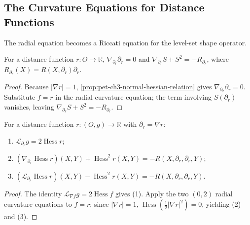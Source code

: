 \subsection{The Curvature Equations for Distance Functions}

The radial equation becomes a Riccati equation for the level-set shape
operator.

\begin{corollary}
  \label{cor:pet-ch3-radial-equation-distance-function}
  \leanok
  For a distance function $r:O\to\mathbb R$, $\nabla_{\partial_r}\partial_r=0$ and
  $\nabla_{\partial_r}S+S^2=-R_{\partial_r}$, where $R_{\partial_r}(X)=R(X,\partial_r)\partial_r$.
\end{corollary}
\begin{proof}
  \leanok
  \sketch
  Because $|\nabla r|=1$, \cref{prop:pet-ch3-normal-hessian-relation} gives
  $\nabla_{\partial_r}\partial_r=0$. Substitute $f=r$ in the radial curvature
  equation; the term involving $S(\partial_r)$ vanishes, leaving
  $\nabla_{\partial_r}S+S^2=-R_{\partial_r}$.
\end{proof}

\begin{proposition}
  \label{prop:pet-ch3-distance-function-curvature-equations}
  \leanok
  For a distance function $r:(O,g)\to\mathbb R$ with $\partial_r=\nabla r$:
  \begin{enumerate}
    \item[(1)] $\mathcal L_{\partial_r}g=2\operatorname{Hess}r$;
    \item[(2)] $(\nabla_{\partial_r}\operatorname{Hess}r)(X,Y)+\operatorname{Hess}^2r(X,Y)=-R(X,\partial_r,\partial_r,Y)$;
    \item[(3)] $(\mathcal L_{\partial_r}\operatorname{Hess}r)(X,Y)-\operatorname{Hess}^2r(X,Y)=-R(X,\partial_r,\partial_r,Y)$.
  \end{enumerate}
\end{proposition}
\begin{proof}
  \leanok
  \sketch
  The identity
  $\mathcal L_{\nabla f}g=2\operatorname{Hess}f$ gives (1). Apply the two
  $(0,2)$ radial curvature equations to $f=r$; since $|\nabla r|=1$,
  $\operatorname{Hess}(\tfrac12|\nabla r|^2)=0$, yielding (2) and (3).
\end{proof}

